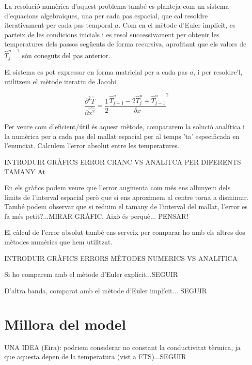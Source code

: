 \documentclass[11pt]{article}
\begin{document}
La resolució numèrica d'aquest problema també es planteja com un sistema d'equacions algebraiques, una per cada pas espacial, que cal resoldre iterativament per cada pas temporal $a$. Com en el mètode d'Euler implícit, es parteix de les condicions inicials i es resol successivament per obtenir les temperatures dels passos següents de forma recursiva, aprofitant que els valors de $\hat{T}_j^{n-1}$ són coneguts del pas anterior.

El sistema es pot expressar en forma matricial per a cada pas $a$, i per resoldre'l, utilitzem el mètode iteratiu de Jacobi.

\begin{equation}
    \frac{\partial^2\hat{T}}{\partial \hat{x^2}} = \frac{1}{2}\frac{\hat{T}_{j+1}^n-2\hat{T}_{j}^n+\hat{T}_{j-1}^n}{\delta x}^2
    \label{crank}
\end{equation}

Per veure com d'eficient/útil és aquest mètode, compararem la solució analítica i la numèrica per a cada pas del mallat espacial per al temps 'ta' especificada en l'enunciat. Calculem l'error absolut entre les temperatures.

INTRODUIR GRÀFICS ERROR CRANC VS ANALITCA PER DIFERENTS TAMANY At

En els gràfics podem veure que l'error augmenta com més ens allunyem dels límits de l'interval espacial però que si ens aproximem al centre torna a disminuir. També podem observar que si reduim el tamany de l'interval del mallat, l'error es fa més petit?...MIRAR GRÀFIC.
Això és perquè... PENSAR!

El càlcul de l'error absolut també ens serveix per comparar-ho amb els altres dos mètodes numèrics que hem utilitzat.

INTRODUIR GRÀFICS ERRORS MÈTODES NUMERICS VS ANALITICA

Si ho comparem amb el mètode d'Euler explícit...SEGUIR

D'altra banda, comparat amb el mètode d'Euler implícit... SEGUIR


\section{Millora del model}

UNA IDEA (Eira): podriem considerar no constant la conductivitat tèrmica, ja que aquesta depen de la temperatura (vist a FTS)...SEGUIR
\end{document}
